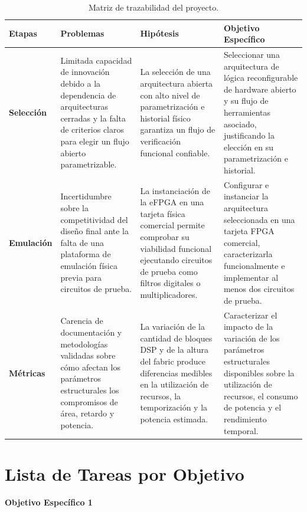     \begin{table}[htbp]
\small
\begin{tabularx}{\textwidth}{|p{1.8cm}|X|X|X|}
\hline
\textbf{Etapas} & \textbf{Problemas} & \textbf{Hipótesis} & \textbf{Objetivo Específico} \\ \hline

\textbf{Selección} & 
Limitada capacidad de innovación debido a la dependencia de arquitecturas cerradas y la falta de criterios claros para elegir un flujo abierto parametrizable. & 
La selección de una arquitectura abierta con alto nivel de parametrización e historial físico garantiza un flujo de verificación funcional confiable. & 
Seleccionar una arquitectura de lógica reconfigurable de hardware abierto y su flujo de herramientas asociado, justificando la elección en su parametrización e historial. \\ \hline

\textbf{Emulación} & 
Incertidumbre sobre la competitividad del diseño final ante la falta de una plataforma de emulación física previa para circuitos de prueba. & 
La instanciación de la eFPGA en una tarjeta física comercial permite comprobar su viabilidad funcional ejecutando circuitos de prueba como filtros digitales o multiplicadores. & 
Configurar e instanciar la arquitectura seleccionada en una tarjeta FPGA comercial, caracterizarla funcionalmente e implementar al menos dos circuitos de prueba. \\ \hline

\textbf{Métricas} & 
Carencia de documentación y metodologías validadas sobre cómo afectan los parámetros estructurales los compromisos de área, retardo y potencia. & 
La variación de la cantidad de bloques DSP y de la altura del fabric produce diferencias medibles en la utilización de recursos, la temporización y la potencia estimada. & 
Caracterizar el impacto de la variación de los parámetros estructurales disponibles sobre la utilización de recursos, el consumo de potencia y el rendimiento temporal. \\ \hline
\end{tabularx}
\caption{Matriz de trazabilidad del proyecto.}
\label{tab:matriz_trazabilidad}
\end{table}
 
\section{Lista de Tareas por Objetivo}

\textbf{\normalsize{Objetivo Específico 1}}

